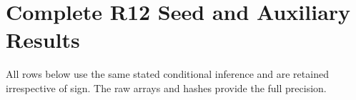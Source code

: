 \section{Complete R12 Seed and Auxiliary Results}\label{app:r12results}
All rows below use the same stated conditional inference and are retained irrespective of sign. The raw arrays and hashes provide the full precision.




